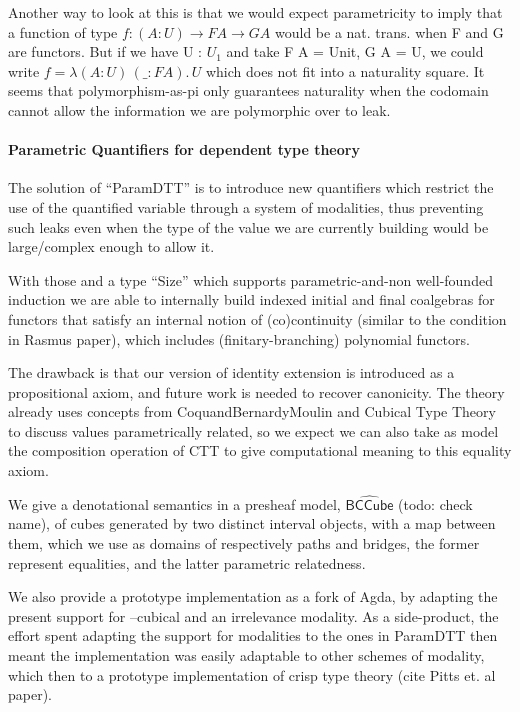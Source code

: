 \documentclass{book}
\newcommand{\sd}{.\,}
\begin{document}
\begin{itemize}
    Another way to look at this is that we would expect parametricity
    to imply that a function of type $f : (A : U) \to F A \to G A$
    would be a nat. trans. when F and G are functors.  But if we have
    U : $U_1$ and take F A = Unit, G A = U, we could write
    $f = \lambda (A : U)\, (\_ : F A)\sd U$ which does not fit into a naturality square.
    It seems that polymorphism-as-pi only guarantees naturality when
    the codomain cannot allow the information we are polymorphic over
    to leak.


\paragraph{Parametric Quantifiers for dependent type theory}
    The solution of ``ParamDTT'' is to introduce new quantifiers which
    restrict the use of the quantified variable through a system of
    modalities, thus preventing such leaks even when the type of the
    value we are currently building would be large/complex enough to
    allow it.

    With those and a type ``Size'' which supports parametric-and-non
    well-founded induction we are able to internally build indexed
    initial and final coalgebras for functors that satisfy an
    internal notion of (co)continuity (similar to the condition in
    Rasmus paper), which includes (finitary-branching) polynomial
    functors.

    The drawback is that our version of identity extension is
    introduced as a propositional axiom, and future work is needed to
    recover canonicity. The theory already uses concepts from
    CoquandBernardyMoulin and Cubical Type Theory to discuss values
    parametrically related, so we expect we can also take as model the
    composition operation of CTT to give computational meaning to this
    equality axiom.

    We give a denotational semantics in a presheaf model,
    $\hat{\mathsf{BCCube}}$ (todo: check name), of cubes generated by two distinct interval
    objects, with a map between them, which we use as domains of
    respectively paths and bridges, the former represent equalities,
    and the latter parametric relatedness.

    We also provide a prototype implementation as a fork of Agda, by
    adapting the present support for --cubical and an irrelevance
    modality. As a side-product, the effort spent adapting the support
    for modalities to the ones in ParamDTT then meant the
    implementation was easily adaptable to other schemes of modality,
    which then to a prototype implementation of crisp type theory
    (cite Pitts et. al paper).
    \end{itemize}
\end{document}
